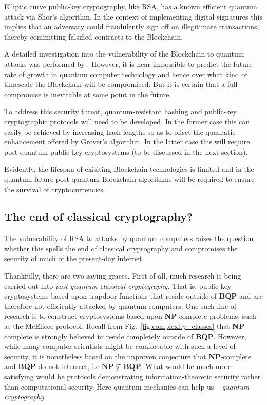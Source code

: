 Elliptic curve public-key cryptography, like RSA, has a known efficient quantum attack via Shor's algorithm. In the context of implementing digital signatures this implies that an adversary could fraudulently sign off on illegitimate transactions, thereby committing falsified contracts to the Blockchain.

A detailed investigation into the vulnerability of the Blockchain to quantum attacks was performed by \cite{bib:TomamichelBlockchain}. However, it is near impossible to predict the future rate of growth in quantum computer technology and hence over what kind of timescale the Blockchain will be compromised. But it is certain that a full compromise is inevitable at some point in the future.

To address this security threat, quantum-resistant hashing and public-key cryptographic protocols will need to be developed. In the former case this can easily be achieved by increasing hash lengths so as to offset the quadratic enhancement offered by Grover's algorithm. In the latter case this will require post-quantum public-key cryptosystems (to be discussed in the next section).

Evidently, the lifespan of exisiting Blockchain technologies is limited and in the quantum future post-quantum Blockchain algorithms will be required to ensure the survival of cryptocurrencies.

%
%

\subsection{The end of classical cryptography?} \label{sec:end_of_class_crypto}

The vulnerability of RSA to attacks by quantum computers raises the question whether this spells the end of classical cryptography and compromises the security of much of the present-day internet.

Thankfully, there are two saving graces. First of all, much research is being carried out into \textit{post-quantum classical cryptography}. That is, public-key cryptosystems based upon trapdoor functions that reside outside of \textbf{BQP} and are therefore not efficiently attacked by quantum computers. One such line of research is to construct cryptosystems based upon \textbf{NP}-complete problems, such as the McEliece protocol. Recall from Fig.~\ref{fig:complexity_classes} that \textbf{NP}-complete is strongly believed to reside completely outside of \textbf{BQP}. However, while many computer scientists might be comfortable with such a level of security, it is nonetheless based on the unproven conjecture that \textbf{NP}-complete and \textbf{BQP} do not intersect, i.e \mbox{$\mathbf{NP}\nsubseteq\mathbf{BQP}$}. What would be much more satisfying would be protocols demonstrating information-theoretic security rather than computational security. Here quantum mechanics can help us -- \textit{quantum cryptography}.

